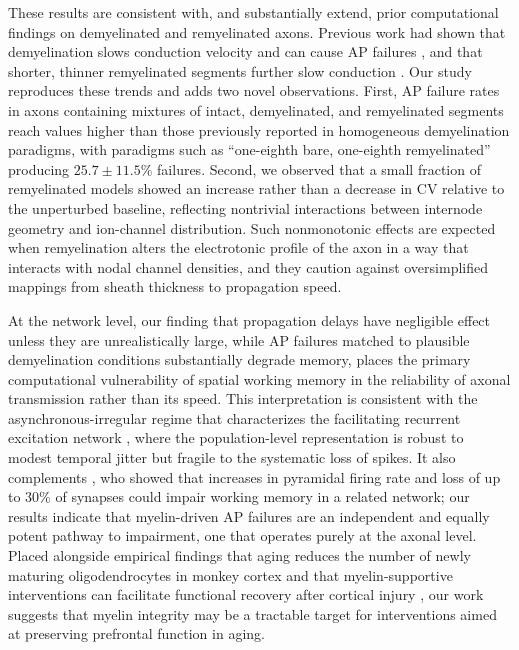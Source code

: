 \documentclass[11pt]{article}
\begin{document}
These results are consistent with, and substantially extend, prior computational findings on demyelinated and remyelinated axons. Previous work had shown that demyelination slows conduction velocity and can cause AP failures \citep{stephanova2003extracellular,naud2019demyelination,coggan2015demyelination}, and that shorter, thinner remyelinated segments further slow conduction \citep{lasiene2008partial,powers2012remyelination,scurfield2018internodal}. Our study reproduces these trends and adds two novel observations. First, AP failure rates in axons containing mixtures of intact, demyelinated, and remyelinated segments reach values higher than those previously reported in homogeneous demyelination paradigms, with paradigms such as ``one-eighth bare, one-eighth remyelinated'' producing $25.7 \pm 11.5\%$ failures. Second, we observed that a small fraction of remyelinated models showed an increase rather than a decrease in CV relative to the unperturbed baseline, reflecting nontrivial interactions between internode geometry and ion-channel distribution. Such nonmonotonic effects are expected when remyelination alters the electrotonic profile of the axon in a way that interacts with nodal channel densities, and they caution against oversimplified mappings from sheath thickness to propagation speed.

At the network level, our finding that propagation delays have negligible effect unless they are unrealistically large, while AP failures matched to plausible demyelination conditions substantially degrade memory, places the primary computational vulnerability of spatial working memory in the reliability of axonal transmission rather than its speed. This interpretation is consistent with the asynchronous-irregular regime that characterizes the facilitating recurrent excitation network \citep{hansel2013short}, where the population-level representation is robust to modest temporal jitter but fragile to the systematic loss of spikes. It also complements \citet{ibanez2020network}, who showed that increases in pyramidal firing rate and loss of up to 30\% of synapses could impair working memory in a related network; our results indicate that myelin-driven AP failures are an independent and equally potent pathway to impairment, one that operates purely at the axonal level. Placed alongside empirical findings that aging reduces the number of newly maturing oligodendrocytes in monkey cortex \citep{dimovasili2022oligodendrocyte} and that myelin-supportive interventions can facilitate functional recovery after cortical injury \citep{go2020vesicles}, our work suggests that myelin integrity may be a tractable target for interventions aimed at preserving prefrontal function in aging.
\end{document}
